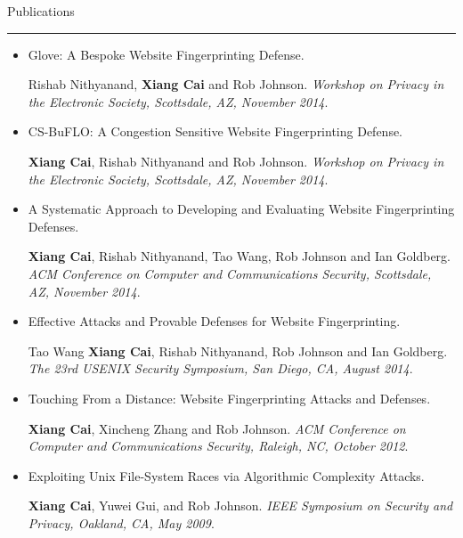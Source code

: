 \documentclass[11pt,oneside]{article}
\newenvironment{ressection}[1]{
	{\fontfamily{phv}\selectfont\Large#1}
	
	\vspace{-8pt} \rule{\textwidth}{.5pt}
	
	\vspace{-4pt}
	\begin{itemize}
	\vspace{.5pt}
}{
	\end{itemize}
}
\newcommand{\resitem}[1]{
	\vspace{2pt}
	\item \begin{flushleft} #1 \end{flushleft}
}
\begin{document}
\begin{ressection}{Publications}
	\resitem{Glove: A Bespoke Website Fingerprinting Defense. \begin{small} Rishab Nithyanand, \textbf{Xiang Cai} and Rob Johnson. \textit{Workshop on Privacy in the Electronic Society, Scottsdale, AZ, November 2014}.
	\end{small}}
	
	\resitem{CS-BuFLO: A Congestion Sensitive Website Fingerprinting Defense. \begin{small} \textbf{Xiang Cai}, Rishab Nithyanand and Rob Johnson. \textit{Workshop on Privacy in the Electronic Society, Scottsdale, AZ, November 2014}.
	\end{small}}
	
	\resitem{A Systematic Approach to Developing and Evaluating Website Fingerprinting Defenses. \begin{small} \textbf{Xiang Cai}, Rishab Nithyanand, Tao Wang, Rob Johnson and Ian Goldberg. \textit{ACM Conference on Computer and Communications Security, Scottsdale, AZ, November 2014}.
	\end{small}}
	
	\resitem{Effective Attacks and Provable Defenses for Website Fingerprinting. \begin{small} Tao Wang \textbf{Xiang Cai}, Rishab Nithyanand, Rob Johnson and Ian Goldberg. \textit{The 23rd USENIX Security Symposium, San Diego, CA, August 2014}.
	\end{small}}

	\resitem{Touching From a Distance: Website Fingerprinting
		Attacks and Defenses. \begin{small} \textbf{Xiang Cai}, Xincheng Zhang
			and Rob Johnson. \textit{ACM Conference on Computer and Communications Security, Raleigh, NC, October 2012}. %
			\end{small}}

	\resitem{Exploiting Unix File-System Races via Algorithmic
		Complexity Attacks. \begin{small} \textbf{Xiang Cai}, Yuwei Gui, and
			Rob Johnson. \textit{IEEE Symposium on Security and Privacy,
				Oakland, CA, May 2009}. 
				\end{small}}

\end{ressection}
\end{document}
